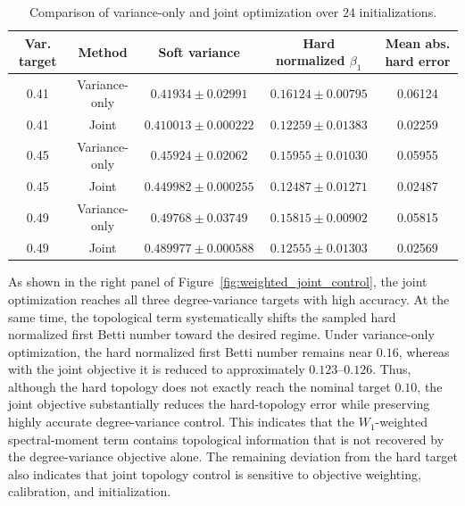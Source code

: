 \documentclass[pdflatex,sn-mathphys-num]{sn-jnl}%
\theoremstyle{thmstyleone}%
\theoremstyle{thmstyletwo}%
\theoremstyle{thmstylethree}%
\begin{document}
\begin{table}[t]
    \centering
    \caption{
    Comparison of variance-only and joint optimization over \(24\) initializations.
    }
    \label{tab:weighted_joint_objective}
    \small
    \begin{tabular}{c|c|c|c|c}
        \hline
        Var. target
        & Method
        & Soft variance
        & Hard normalized \(\beta_1\)
        & Mean abs. hard error \\
        \hline
        0.41
        & Variance-only
        & \(0.41934\pm0.02991\)
        & \(0.16124\pm0.00795\)
        & 0.06124 \\
        0.41
        & Joint
        & \(0.410013\pm0.000222\)
        & \(0.12259\pm0.01383\)
        & 0.02259 \\
        \hline
        0.45
        & Variance-only
        & \(0.45924\pm0.02062\)
        & \(0.15955\pm0.01030\)
        & 0.05955 \\
        0.45
        & Joint
        & \(0.449982\pm0.000255\)
        & \(0.12487\pm0.01271\)
        & 0.02487 \\
        \hline
        0.49
        & Variance-only
        & \(0.49768\pm0.03749\)
        & \(0.15815\pm0.00902\)
        & 0.05815 \\
        0.49
        & Joint
        & \(0.489977\pm0.000588\)
        & \(0.12555\pm0.01303\)
        & 0.02569 \\
        \hline
    \end{tabular}
\end{table}

As shown in the right panel of Figure~\ref{fig:weighted_joint_control}, the joint optimization reaches all three degree-variance targets with high accuracy.
At the same time, the topological term systematically shifts the sampled hard normalized first Betti number toward the desired regime.
Under variance-only optimization, the hard normalized first Betti number remains near $0.16$,
whereas with the joint objective it is reduced to approximately
$0.123\text{--}0.126$.
Thus, although the hard topology does not exactly reach the nominal target \(0.10\), the joint objective substantially reduces the hard-topology error while preserving highly accurate degree-variance control.
This indicates that the \(W_1\)-weighted spectral-moment term contains topological information that is not recovered by the degree-variance objective alone.
The remaining deviation from the hard target also indicates that joint topology control is sensitive to objective weighting, calibration, and initialization.
\end{document}
